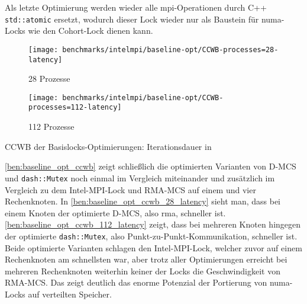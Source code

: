 Als letzte Optimierung werden wieder alle \gls{mpi}-Operationen durch C++ \texttt{std::atomic} ersetzt,
wodurch dieser Lock wieder nur als Baustein für \gls{numa}-Locks wie den Cohort-Lock \cite{Cohort-Lock} dienen kann.

\begin{benchmark}[h]
    \begin{subfigure}{.5\textwidth}
        \texttt{[image: benchmarks/intelmpi/baseline-opt/CCWB-processes=28-latency]}
        \caption{28 Prozesse}
        \label{ben:baseline_opt_ccwb_28_latency}
    \end{subfigure}
    \begin{subfigure}{.5\textwidth}
        \texttt{[image: benchmarks/intelmpi/baseline-opt/CCWB-processes=112-latency]}
        \caption{112 Prozesse}
        \label{ben:baseline_opt_ccwb_112_latency}
    \end{subfigure}
    \caption{CCWB der Basislocks-Optimierungen: Iterationsdauer in }
    \label{ben:baseline_opt_ccwb}
\end{benchmark}

\clearpage

\autoref{ben:baseline_opt_ccwb} zeigt schließlich die optimierten Varianten von D-MCS und \texttt{dash::Mutex} noch einmal im Vergleich miteinander
und zusätzlich im Vergleich zu dem Intel-MPI-Lock und RMA-MCS auf einem und vier Rechenknoten.
In \autoref{ben:baseline_opt_ccwb_28_latency} sieht man,
dass bei einem Knoten der optimierte D-MCS,
also \gls{rma},
schneller ist.
\autoref{ben:baseline_opt_ccwb_112_latency} zeigt,
dass bei mehreren Knoten hingegen der optimierte \texttt{dash::Mutex},
also Punkt-zu-Punkt-Kommunikation,
schneller ist.
Beide optimierte Varianten schlagen den Intel-MPI-Lock,
welcher zuvor auf einem Rechenknoten am schnellsten war,
aber trotz aller Optimierungen erreicht bei mehreren Rechenknoten weiterhin keiner der Locks die Geschwindigkeit von RMA-MCS.
Das zeigt deutlich das enorme Potenzial der Portierung von \gls{numa}-Locks auf verteilten Speicher.
